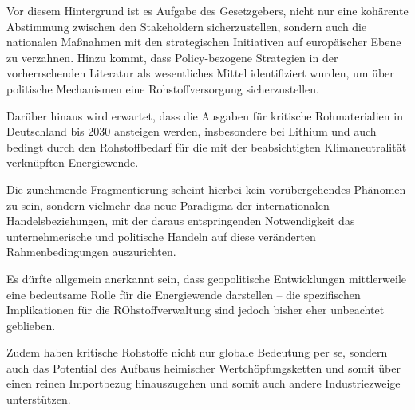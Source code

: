 \documentclass[12pt,a4paper,oneside]{book} %
\begin{document}
	Vor diesem Hintergrund ist es Aufgabe des Gesetzgebers, nicht nur eine kohärente Abstimmung zwischen den Stakeholdern sicherzustellen, sondern auch die nationalen Maßnahmen mit den strategischen Initiativen auf europäischer Ebene zu verzahnen. Hinzu kommt, dass Policy-bezogene Strategien in der vorherrschenden Literatur als wesentliches Mittel identifiziert wurden, um über politische Mechanismen eine Rohstoffversorgung sicherzustellen.\Autocite{Resilience of Critical Minerals Supply Chain, S. 11}
	
	Darüber hinaus wird erwartet, dass die Ausgaben für kritische Rohmaterialien in Deutschland bis 2030 ansteigen werden, insbesondere bei Lithium und auch bedingt durch den Rohstoffbedarf für die mit der beabsichtigten Klimaneutralität verknüpften Energiewende.\autocite{McKinsey Studie, S. 3}
	
	Die zunehmende Fragmentierung scheint hierbei kein vorübergehendes Phänomen zu sein, sondern vielmehr das neue Paradigma der internationalen Handelsbeziehungen, mit der daraus entspringenden Notwendigkeit das unternehmerische und politische Handeln auf diese veränderten Rahmenbedingungen auszurichten.
	
	Es dürfte allgemein anerkannt sein, dass geopolitische Entwicklungen mittlerweile eine bedeutsame Rolle für die Energiewende darstellen -- die spezifischen Implikationen für die ROhstoffverwaltung sind jedoch bisher eher unbeachtet geblieben.
	
	Zudem haben kritische Rohstoffe nicht nur globale Bedeutung per se, sondern auch das Potential des Aufbaus heimischer Wertchöpfungsketten und somit über einen reinen Importbezug hinauszugehen und somit auch andere Industriezweige unterstützen.
\end{document}
